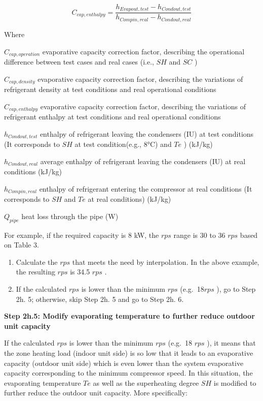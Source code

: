 \begin{equation}
C_{cap,enthalpy} = \frac{h_{Evapout,test}-h_{Condout,test}}{h_{Compin,real}-h_{Condout,real}}
\end{equation}

Where

\(C_{cap,operation}\) evaporative capacity correction factor, describing the operational difference between test cases and real cases (i.e., \(SH\) and \(SC\) )

\(C_{cap,density}\) evaporative capacity correction factor, describing the variations of refrigerant density at test conditions and real operational conditions

\(C_{cap,enthalpy}\) evaporative capacity correction factor, describing the variations of refrigerant enthalpy at test conditions and real operational conditions

\(h_{Condout,test}\) enthalpy of refrigerant leaving the condensers (IU) at test conditions (It corresponds to \(SH\) at test condition(e.g., 8°C) and \(Te\) ) (kJ/kg)

\(h_{Condout,real}\) average enthalpy of refrigerant leaving the condensers (IU) at real conditions (kJ/kg)

\(h_{Compin,real}\) enthalpy of refrigerant entering the compressor at real conditions (It corresponds to \(SH\) and \(Te\) at real conditions) (kJ/kg)

\(Q_{pipe}\) heat loss through the pipe (W)

For example, if the required capacity is 8 kW, the \(rps\) range is 30 to 36 \(rps\) based on Table 3.

\begin{enumerate}
\def\labelenumi{\alph{enumi}.}
\setcounter{enumi}{2}
\item
  Calculate the \(rps\) that meets the need by interpolation. In the above example, the resulting \(rps\) is 34.5 \(rps\) .
\item
  If the calculated \(rps\) is lower than the minimum \(rps\) (e.g.~18\(rps\) ), go to Step 2h. 5; otherwise, skip Step 2h. 5 and go to Step 2h. 6.
\end{enumerate}

\textbf{Step 2h.5: Modify evaporating temperature to further reduce outdoor unit capacity}

If the calculated \(rps\) is lower than the minimum \(rps\) (e.g.~18 \(rps\) ), it means that the zone heating load (indoor unit side) is so low that it leads to an evaporative capacity (outdoor unit side) which is even lower than the system evaporative capacity corresponding to the minimum compressor speed. In this situation, the evaporating temperature \(Te\) as well as the superheating degree \(SH\) is modified to further reduce the outdoor unit capacity. More specifically:

